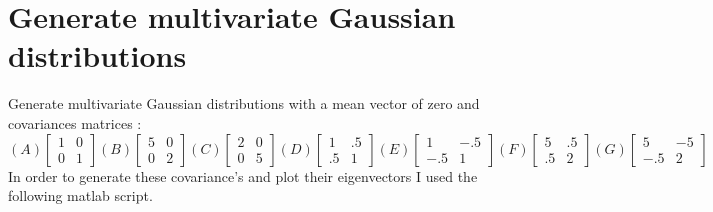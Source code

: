 \documentclass{article}
\begin{document}
\section{Generate multivariate Gaussian distributions}
\large{Generate multivariate Gaussian distributions with a mean vector of zero and covariances matrices :}
\[
(A)\begin{bmatrix} 
        1 & 0\\
        0 & 1
\end{bmatrix}
(B)\begin{bmatrix} 
        5 & 0\\
        0 & 2
\end{bmatrix}
(C)\begin{bmatrix} 
        2 & 0\\
        0 & 5
\end{bmatrix}
(D)\begin{bmatrix} 
        1 & .5\\
        .5 & 1
\end{bmatrix}
(E)\begin{bmatrix} 
        1 & -.5\\
        -.5 & 1
\end{bmatrix}
(F)\begin{bmatrix} 
        5 & .5\\
        .5 & 2
\end{bmatrix}
(G)\begin{bmatrix} 
        5 & -5\\
        -.5 & 2
\end{bmatrix}
\]
\break\break
In order to generate these covariance's and plot their eigenvectors I used the following matlab script.
\end{document}

